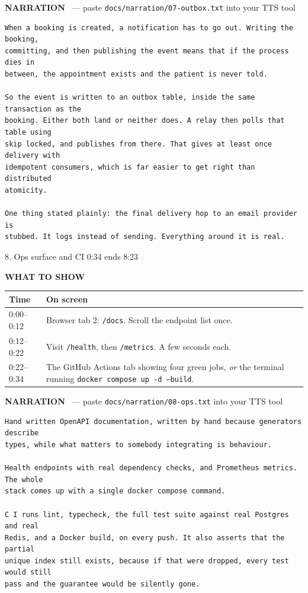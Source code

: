 \documentclass[11pt,a4paper]{article}
\newcommand{\segbar}[3]{%
  \vspace{12pt}
  \noindent\colorbox{accent}{\parbox{\dimexpr\textwidth-2\fboxsep}{%
    \color{white}\bfseries\large\strut #1 \hfill \normalsize #2 \quad ends #3}}
  \par\vspace{7pt}}
\newcommand{\showhdr}{\noindent\textcolor{showc}{\textbf{WHAT TO SHOW}}\par\vspace{2pt}}
\newcommand{\voicehdr}[1]{\vspace{4pt}\noindent\textcolor{voice}{\textbf{NARRATION}}%
  \ \textcolor{soft}{\small --- paste \texttt{docs/narration/#1.txt} into your TTS tool}\par\vspace{2pt}}
\begin{document}
\voicehdr{07-outbox}
\begin{lstlisting}[style=tts]
When a booking is created, a notification has to go out. Writing the booking,
committing, and then publishing the event means that if the process dies in
between, the appointment exists and the patient is never told.

So the event is written to an outbox table, inside the same transaction as the
booking. Either both land or neither does. A relay then polls that table using
skip locked, and publishes from there. That gives at least once delivery with
idempotent consumers, which is far easier to get right than distributed
atomicity.

One thing stated plainly: the final delivery hop to an email provider is
stubbed. It logs instead of sending. Everything around it is real.
\end{lstlisting}

\segbar{8. Ops surface and CI}{0:34}{8:23}

\showhdr
\begin{longtable}{@{}p{1.6cm} p{13.4cm}@{}}
\toprule
\textbf{Time} & \textbf{On screen} \\
\midrule
\endhead
0:00--0:12 & Browser tab 2: \texttt{/docs}. Scroll the endpoint list once. \\
0:12--0:22 & Visit \texttt{/health}, then \texttt{/metrics}. A few seconds each. \\
0:22--0:34 & The GitHub Actions tab showing four green jobs, \emph{or} the terminal
             running \texttt{docker compose up -d --build}. \\
\bottomrule
\end{longtable}

\voicehdr{08-ops}
\begin{lstlisting}[style=tts]
Hand written OpenAPI documentation, written by hand because generators describe
types, while what matters to somebody integrating is behaviour.

Health endpoints with real dependency checks, and Prometheus metrics. The whole
stack comes up with a single docker compose command.

C I runs lint, typecheck, the full test suite against real Postgres and real
Redis, and a Docker build, on every push. It also asserts that the partial
unique index still exists, because if that were dropped, every test would still
pass and the guarantee would be silently gone.
\end{lstlisting}
\end{document}
